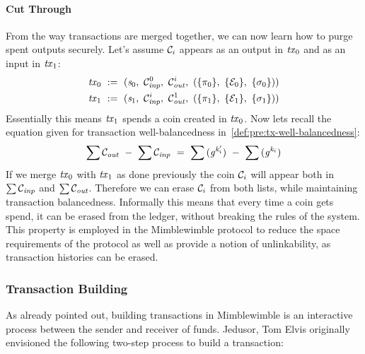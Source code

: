 \paragraph{Cut Through} \label{par:pre:mimblewimble:cut}
From the way transactions are merged together, we can now learn how to purge spent outputs securely.
Let's assume $\mathcal{C}_i$ appears as an output in $\mathit{tx}_0$ and as an input in $\mathit{tx}_1$:
\begin{gather*}
    \mathit{tx}_0 ~:=~ (\mathit{s}_0 ,~ \mathcal{C}_{\mathit{inp}}^0 ,~ \mathcal{C}_{\mathit{out}}^i ,~ (\{\pi_0\} ,~ \{\mathcal{E}_0\} ,~ \{\sigma_0\}) )\\
    \mathit{tx}_1 ~:=~ (\mathit{s}_1 ,~ \mathcal{C}_{\mathit{inp}}^i ,~ \mathcal{C}_{\mathit{out}}^1 ,~ (\{\pi_1\} ,~ \{\mathcal{E}_1\} ,~ \{\sigma_1\}) )\\
\end{gather*}
Essentially this means $\mathit{tx}_1$ spends a coin created in $\mathit{tx}_0$.
Now lets recall the equation given for transaction well-balancedness in~\ref{def:pre:tx-well-balancedness}:
\[ \sum{\mathcal{C}_{\mathit{out}}} ~-~ \sum{\mathcal{C}_{\mathit{inp}}} ~=~ \sum{(\mathit{g}^{\mathit{k}'_i})} ~-~ \sum{(\mathit{g}^{\mathit{k}_i})} \]
If we merge $\mathit{tx}_0$ with $\mathit{tx}_1$ as done previously the coin $\mathcal{C}_i$ will appear both in $\sum{\mathcal{C}_{\mathit{inp}}}$ and $\sum{\mathcal{C}_{\mathit{out}}}$.
Therefore we can erase $\mathcal{C}_i$ from both lists, while maintaining transaction balancedness.
Informally this means that every time a coin gets spend, it can be erased from the ledger, without breaking the rules of the system.
This property is employed in the Mimblewimble protocol to reduce the space requirements of the protocol as well as provide a notion of unlinkability, as transaction histories can be erased.

\subsubsection{Transaction Building} \label{subsec:pre:mimblewimble:txbuild}
As already pointed out, building transactions in Mimblewimble is an interactive process between the sender and receiver of funds.
Jedusor, Tom Elvis originally envisioned the following two-step process to build a transaction:~\cite{jedusor2016mimblewimble}

